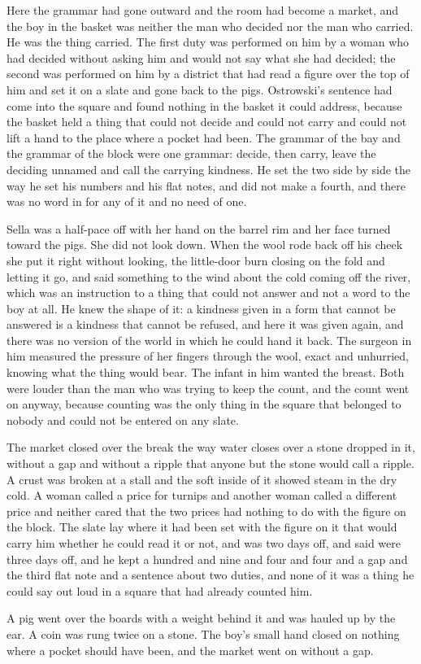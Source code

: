 Here the grammar had gone outward and the room had become a market, and the boy in the basket was neither the man who decided nor the man who carried. He was the thing carried. The first duty was performed on him by a woman who had decided without asking him and would not say what she had decided; the second was performed on him by a district that had read a figure over the top of him and set it on a slate and gone back to the pigs. Ostrowski's sentence had come into the square and found nothing in the basket it could address, because the basket held a thing that could not decide and could not carry and could not lift a hand to the place where a pocket had been. The grammar of the bay and the grammar of the block were one grammar: decide, then carry, leave the deciding unnamed and call the carrying kindness. He set the two side by side the way he set his numbers and his flat notes, and did not make a fourth, and there was no word in  for any of it and no need of one.

Sella was a half-pace off with her hand on the barrel rim and her face turned toward the pigs. She did not look down. When the wool rode back off his cheek she put it right without looking, the little-door burn closing on the fold and letting it go, and said something to the wind about the cold coming off the river, which was an instruction to a thing that could not answer and not a word to the boy at all. He knew the shape of it: a kindness given in a form that cannot be answered is a kindness that cannot be refused, and here it was given again, and there was no version of the world in which he could hand it back. The surgeon in him measured the pressure of her fingers through the wool, exact and unhurried, knowing what the thing would bear. The infant in him wanted the breast. Both were louder than the man who was trying to keep the count, and the count went on anyway, because counting was the only thing in the square that belonged to nobody and could not be entered on any slate.

\scenebreak

The market closed over the break the way water closes over a stone dropped in it, without a gap and without a ripple that anyone but the stone would call a ripple. A crust was broken at a stall and the soft inside of it showed steam in the dry cold. A woman called a price for turnips and another woman called a different price and neither cared that the two prices had nothing to do with the figure on the block. The slate lay where it had been set with the figure on it that would carry him whether he could read it or not, and  was two days off, and  said  were three days off, and he kept a hundred and nine and four and four and a gap and the third flat note and a sentence about two duties, and none of it was a thing he could say out loud in a square that had already counted him.

A pig went over the boards with a weight behind it and was hauled up by the ear. A coin was rung twice on a stone. The boy's small hand closed on nothing where a pocket should have been, and the market went on without a gap.

